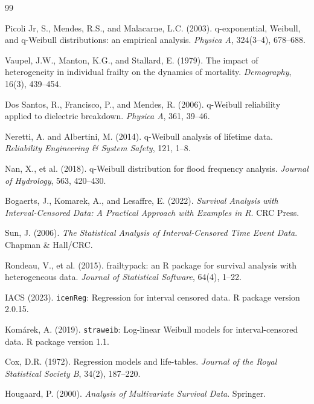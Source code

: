 \documentclass[12pt,a4paper]{article}
\begin{document}
\begin{thebibliography}{99}

Picoli Jr, S., Mendes, R.S., and Malacarne, L.C. (2003). q-exponential, Weibull, and q-Weibull distributions: an empirical analysis. \emph{Physica A}, 324(3--4), 678--688.

Vaupel, J.W., Manton, K.G., and Stallard, E. (1979). The impact of heterogeneity in individual frailty on the dynamics of mortality. \emph{Demography}, 16(3), 439--454.

Dos Santos, R., Francisco, P., and Mendes, R. (2006). q-Weibull reliability applied to dielectric breakdown. \emph{Physica A}, 361, 39--46.

Neretti, A. and Albertini, M. (2014). q-Weibull analysis of lifetime data. \emph{Reliability Engineering \& System Safety}, 121, 1--8.

Nan, X., et al. (2018). q-Weibull distribution for flood frequency analysis. \emph{Journal of Hydrology}, 563, 420--430.

Bogaerts, J., Komarek, A., and Lesaffre, E. (2022). \emph{Survival Analysis with Interval-Censored Data: A Practical Approach with Examples in R}. CRC Press.

Sun, J. (2006). \emph{The Statistical Analysis of Interval-Censored Time Event Data}. Chapman \& Hall/CRC.

Rondeau, V., et al. (2015). frailtypack: an R package for survival analysis with heterogeneous data. \emph{Journal of Statistical Software}, 64(4), 1--22.

IACS (2023). \texttt{icenReg}: Regression for interval censored data. R package version 2.0.15.

Kom\'arek, A. (2019). \texttt{straweib}: Log-linear Weibull models for interval-censored data. R package version 1.1.

Cox, D.R. (1972). Regression models and life-tables. \emph{Journal of the Royal Statistical Society B}, 34(2), 187--220.

Hougaard, P. (2000). \emph{Analysis of Multivariate Survival Data}. Springer.


\end{thebibliography}
\end{document}
